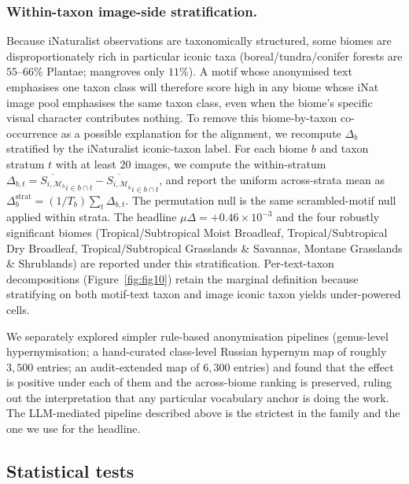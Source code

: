 \documentclass[11pt,a4paper]{article}
\begin{document}
\subsubsection*{Within-taxon image-side stratification.}
Because iNaturalist observations are taxonomically structured, some
biomes are disproportionately rich in particular iconic taxa
(boreal/tundra/conifer forests are $55$--$66\%$ Plantae; mangroves
only $11\%$). A motif whose anonymised text emphasises one taxon
class will therefore score high in any biome whose iNat image pool
emphasises the same taxon class, even when the biome's specific
visual character contributes nothing. To remove this biome-by-taxon
co-occurrence as a possible explanation for the alignment, we
recompute $\Delta_b$ stratified by the iNaturalist iconic-taxon
label. For each biome $b$ and taxon stratum $t$ with at least $20$
images, we compute the within-stratum
$\Delta_{b,t} = \overline{S_{i,\mathcal{M}_b}}_{i\in b\cap t}
              - \overline{S_{i,\mathcal{M}_{\overline{b}}}}_{i\in b\cap t}$,
and report the uniform across-strata mean as
$\Delta^{\text{strat}}_b = (1/T_b)\sum_t \Delta_{b,t}$. The
permutation null is the same scrambled-motif null applied within
strata. The headline $\mu\Delta = +0.46\times 10^{-3}$ and the four
robustly significant biomes (Tropical/Subtropical Moist Broadleaf,
Tropical/Subtropical Dry Broadleaf, Tropical/Subtropical Grasslands
\& Savannas, Montane Grasslands \& Shrublands) are reported under
this stratification. Per-text-taxon decompositions
(Figure~\ref{fig:fig10}) retain the marginal definition because
stratifying on both motif-text taxon and image iconic taxon yields
under-powered cells.

We separately explored simpler rule-based anonymisation pipelines
(genus-level hypernymisation; a hand-curated class-level Russian
hypernym map of roughly $3{,}500$ entries; an audit-extended map
of $6{,}300$ entries) and found that the effect is positive under
each of them and the across-biome ranking is preserved, ruling out
the interpretation that any particular vocabulary anchor is doing
the work. The LLM-mediated pipeline described above is the
strictest in the family and the one we use for the headline.

\subsection*{Statistical tests}
\end{document}
